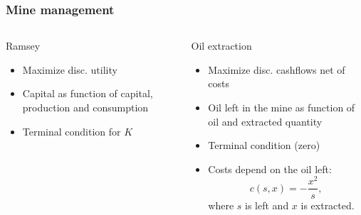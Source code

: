 \documentclass[ps,CFframes_inst]{beamer}
\begin{document}
\begin{frame}
    \frametitle{Mine management} 
    \begin{columns}
	\begin{column}{5cm}
	    \begin{block}{Ramsey}
		\begin{itemize}
		    \item Maximize disc. utility
		
		    \item Capital as function of capital, production 
		    and consumption
		
		    \item Terminal condition for $K$
		\end{itemize}
		\end{block}
		\end{column}
\pause		
	\begin{column}{5cm}
	    \begin{block}{Oil extraction}
		\begin{itemize}
		    \item Maximize disc. cashflows net of costs
		
		    \item Oil left in the mine as function of oil and 
		    extracted quantity
		
		    \item Terminal condition (zero)
		    
		    \item Costs depend on the oil left:
		    $$
		    c(s,x)=-\frac{x^{2}}{s},
		    $$
		    where $s$ is left and $x$ is extracted.
		    
		\end{itemize}
		\end{block}
		\end{column}
	\end{columns}

\end{frame}



\end{document}
